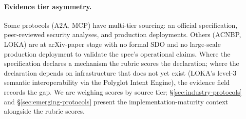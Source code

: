 \paragraph{Evidence tier asymmetry.} Some protocols
(A2A, MCP) have multi-tier sourcing: an official
specification, peer-reviewed security analyses, and
production deployments. Others (ACNBP, LOKA) are at
arXiv-paper stage with no formal SDO and no large-scale
production deployment to validate the spec's
operational claims. Where the specification declares a
mechanism the rubric scores the declaration; where the
declaration depends on infrastructure that does not
yet exist (LOKA's level-3 semantic interoperability via
the Polyglot Intent Engine), the evidence field records
the gap. We are weighing scores by source tier;
\S\ref{sec:industry-protocols} and
\S\ref{sec:emerging-protocols} present the
implementation-maturity context alongside the rubric
scores.
